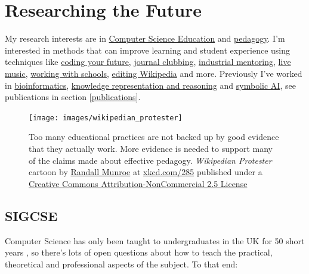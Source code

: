 \documentclass[
  12pt,
]{book}
\begin{document}
\hypertarget{research}{%
\chapter{Researching the Future}\label{research}}

My research interests are in \href{https://en.wikipedia.org/wiki/Computer_science_education}{Computer Science Education} and \href{https://en.wikipedia.org/wiki/Pedagogy}{pedagogy}. \citep{CERhandbook, JohnBiggs2011, Fry2014} I'm interested in methods that can improve learning and student experience using techniques like \href{https://www.cdyf.me}{coding your future}, \href{https://sigcse.cs.manchester.ac.uk/}{journal clubbing}, \href{https://www.cs.manchester.ac.uk/connect/business-engagement/industrial-mentoring/}{industrial mentoring}, \protect\hyperlink{tuningcomplete}{live music}, \href{https://personalpages.manchester.ac.uk/staff/duncan.hull/coding-their-future.html}{working with schools}, \protect\hyperlink{wikipedia}{editing Wikipedia} and more. Previously I've worked in \href{https://en.wikipedia.org/wiki/Bioinformatics}{bioinformatics}, \href{https://en.wikipedia.org/wiki/Knowledge_representation_and_reasoning}{knowledge representation and reasoning} and \href{https://en.wikipedia.org/wiki/Symbolic_artificial_intelligence}{symbolic AI}, see publications in section \ref{publications}.

\begin{figure}

{\centering \texttt{[image: images/wikipedian\_protester]} 

}

\caption{Too many educational practices are not backed up by good evidence that they actually work. More evidence is needed to support many of the claims made about effective pedagogy. \emph{Wikipedian Protester} cartoon by \href{https://en.wikipedia.org/wiki/Randall_Munroe}{Randall Munroe} at \href{https://xkcd.com/285/}{xkcd.com/285} published under a \href{https://creativecommons.org/licenses/by-nc/2.5/}{Creative Commons Attribution-NonCommercial 2.5 License}}\label{fig:unnamed-chunk-5}
\end{figure}



\hypertarget{sigcse}{%
\section{SIGCSE}\label{sigcse}}

Computer Science has only been taught to undergraduates in the UK for 50 short years \citep{babygrowsup, sigcse50}, so there's lots of open questions about how to teach the practical, theoretical and professional aspects of the subject. To that end:
\end{document}

